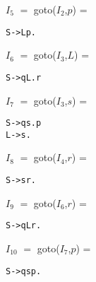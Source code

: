 \documentclass[12pt,fullpage]{exam}
\begin{document}
\begin{questions}
\begin{multicols}{2}
$I_5$ $=$ goto($I_2$,$p$) =
\begin{lstlisting}
S->Lp.

\end{lstlisting}
\columnbreak
$I_6$ $=$ goto($I_3$,$L$) =
\begin{lstlisting}
S->qL.r
\end{lstlisting}

$I_7$ $=$ goto($I_3$,$s$) =
\begin{lstlisting}
S->qs.p
L->s.
\end{lstlisting}
$I_8$ $=$ goto($I_4$,$r$) =
\begin{lstlisting}
S->sr.
\end{lstlisting}

$I_9$ $=$ goto($I_6$,$r$) =
\begin{lstlisting}
S->qLr.
\end{lstlisting}

$I_{10}$ $=$ goto($I_7$,$p$) =
\begin{lstlisting}
S->qsp.
\end{lstlisting}
\end{multicols}

{}
\end{questions}
\end{document}

